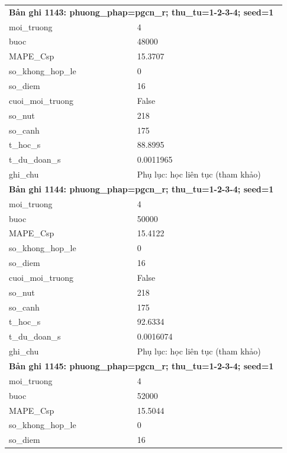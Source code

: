 \begin{longtable}{p{0.43\linewidth}p{0.50\linewidth}}
\midrule
\multicolumn{2}{p{0.95\linewidth}}{\textbf{Bản ghi 1143: phuong\_phap=pgcn\_r; thu\_tu=1-2-3-4; seed=1}} \\
moi\_\allowbreak truong & 4 \\
buoc & 48000 \\
MAPE\_\allowbreak Csp & 15.3707 \\
so\_\allowbreak khong\_\allowbreak hop\_\allowbreak le & 0 \\
so\_\allowbreak diem & 16 \\
cuoi\_\allowbreak moi\_\allowbreak truong & False \\
so\_\allowbreak nut & 218 \\
so\_\allowbreak canh & 175 \\
t\_\allowbreak hoc\_\allowbreak s & 88.8995 \\
t\_\allowbreak du\_\allowbreak doan\_\allowbreak s & 0.0011965 \\
ghi\_\allowbreak chu & Phụ lục: học liên tục (tham khảo) \\
\midrule
\multicolumn{2}{p{0.95\linewidth}}{\textbf{Bản ghi 1144: phuong\_phap=pgcn\_r; thu\_tu=1-2-3-4; seed=1}} \\
moi\_\allowbreak truong & 4 \\
buoc & 50000 \\
MAPE\_\allowbreak Csp & 15.4122 \\
so\_\allowbreak khong\_\allowbreak hop\_\allowbreak le & 0 \\
so\_\allowbreak diem & 16 \\
cuoi\_\allowbreak moi\_\allowbreak truong & False \\
so\_\allowbreak nut & 218 \\
so\_\allowbreak canh & 175 \\
t\_\allowbreak hoc\_\allowbreak s & 92.6334 \\
t\_\allowbreak du\_\allowbreak doan\_\allowbreak s & 0.0016074 \\
ghi\_\allowbreak chu & Phụ lục: học liên tục (tham khảo) \\
\midrule
\multicolumn{2}{p{0.95\linewidth}}{\textbf{Bản ghi 1145: phuong\_phap=pgcn\_r; thu\_tu=1-2-3-4; seed=1}} \\
moi\_\allowbreak truong & 4 \\
buoc & 52000 \\
MAPE\_\allowbreak Csp & 15.5044 \\
so\_\allowbreak khong\_\allowbreak hop\_\allowbreak le & 0 \\
so\_\allowbreak diem & 16 \\

\end{longtable}
